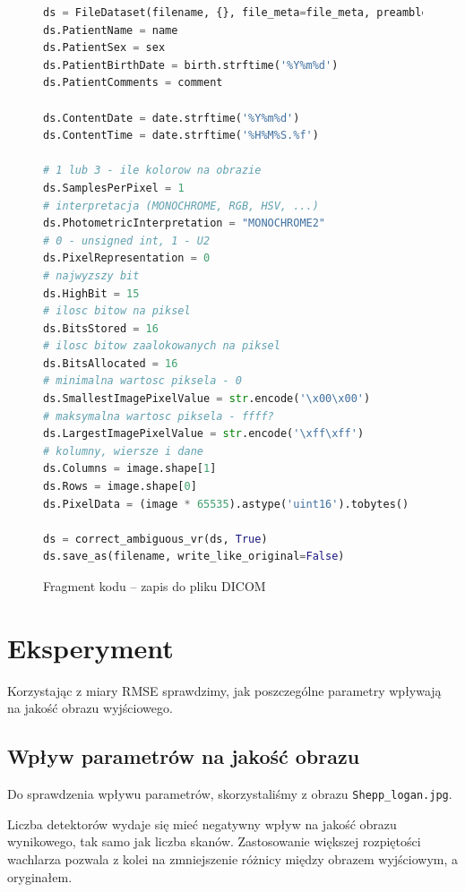 \documentclass[polish,polish,a4paper]{article}
\begin{document}
			\begin{figure}[!h]
				\centering
				\begin{lstlisting}[language=Python, frame=single]
ds = FileDataset(filename, {}, file_meta=file_meta, preamble=b"\0" * 128)
ds.PatientName = name
ds.PatientSex = sex
ds.PatientBirthDate = birth.strftime('%Y%m%d')
ds.PatientComments = comment

ds.ContentDate = date.strftime('%Y%m%d')
ds.ContentTime = date.strftime('%H%M%S.%f')

# 1 lub 3 - ile kolorow na obrazie
ds.SamplesPerPixel = 1
# interpretacja (MONOCHROME, RGB, HSV, ...)
ds.PhotometricInterpretation = "MONOCHROME2"
# 0 - unsigned int, 1 - U2
ds.PixelRepresentation = 0
# najwyzszy bit
ds.HighBit = 15
# ilosc bitow na piksel
ds.BitsStored = 16
# ilosc bitow zaalokowanych na piksel
ds.BitsAllocated = 16
# minimalna wartosc piksela - 0
ds.SmallestImagePixelValue = str.encode('\x00\x00')
# maksymalna wartosc piksela - ffff?
ds.LargestImagePixelValue = str.encode('\xff\xff')
# kolumny, wiersze i dane
ds.Columns = image.shape[1]
ds.Rows = image.shape[0]
ds.PixelData = (image * 65535).astype('uint16').tobytes()

ds = correct_ambiguous_vr(ds, True)
ds.save_as(filename, write_like_original=False)
				\end{lstlisting}
				\caption{Fragment kodu -- zapis do pliku DICOM}
				\label{dicomsave}
			\end{figure}
			
	\section{Eksperyment}
		Korzystając z miary RMSE sprawdzimy, 
		jak poszczególne parametry wpływają na jakość obrazu wyjściowego. 
		
		\subsection{Wpływ parametrów na jakość obrazu}
		Do sprawdzenia wpływu parametrów, skorzystaliśmy z obrazu \texttt{Shepp\_logan.jpg}.
		
		Liczba detektorów wydaje się mieć negatywny wpływ na jakość obrazu wynikowego, tak samo jak liczba skanów. Zastosowanie większej rozpiętości wachlarza pozwala z kolei na zmniejszenie różnicy między obrazem wyjściowym, a oryginałem.
		
\end{document}
